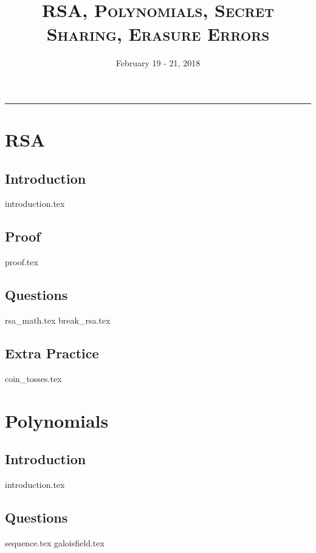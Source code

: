 \documentclass{exam}
\title{\Large \textsc{RSA, Polynomials, Secret Sharing, Erasure Errors}}
\date{February 19 - 21, 2018}
\begin{document}
\maketitle
\rule{\textwidth}{0.15em}
\fontsize{12}{15}\selectfont
\thispagestyle{empty}

\section{RSA}
\subsection{Introduction}
{introduction.tex}
\subsection{Proof}
{proof.tex}
\subsection{Questions}
\begin{questions}
{rsa_math.tex}
{break_rsa.tex}
\end{questions}
\subsection{Extra Practice}
\begin{questions}
{coin_tosses.tex}
\end{questions}

\section{Polynomials}
\subsection{Introduction}
{introduction.tex}
\subsection{Questions}
\begin{questions}
{sequence.tex}
{galoisfield.tex}
\end{questions}
\end{document}
